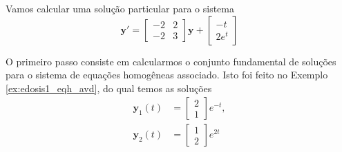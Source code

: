 \begin{ex}
  Vamos calcular uma solução particular para o sistema
  \begin{equation}\label{eq:ex_edosis1_eqnh}
    \pmb{y}' =
    \begin{bmatrix}
      -2 & 2 \\
      -2 & 3
    \end{bmatrix}\pmb{y} +
    \begin{bmatrix}
      -t \\
      2e^{t}
    \end{bmatrix}
  \end{equation}

  O primeiro passo consiste em calcularmos o conjunto fundamental de soluções para o sistema de equações homogêneas associado. Isto foi feito no Exemplo \ref{ex:edosis1_eqh_avd}, do qual temos as soluções
\begin{align}
  \pmb{y}_1(t) &=
                 \begin{bmatrix}
                   2\\
                   1
                 \end{bmatrix}e^{-t},\\
  \pmb{y}_2(t) &=
                 \begin{bmatrix}
                   1\\
                   2
                 \end{bmatrix}e^{2t}
\end{align}


\end{ex}
